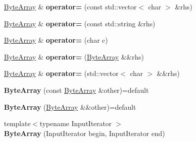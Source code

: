 \begin{DoxyCompactItemize}
\mbox{\hyperlink{class_cpp_serial_port_1_1_byte_array}{Byte\+Array}} \& {\bfseries operator=} (const std\+::vector$<$ char $>$ \&rhs)
\item 
\mbox{\label{class_cpp_serial_port_1_1_byte_array_ae19a4bc286a8e5f4f70e2cc2bb54d94e}} 
\mbox{\hyperlink{class_cpp_serial_port_1_1_byte_array}{Byte\+Array}} \& {\bfseries operator=} (const std\+::string \&rhs)
\item 
\mbox{\label{class_cpp_serial_port_1_1_byte_array_ac47b9704fc6b80017c55a5f8d5c52add}} 
\mbox{\hyperlink{class_cpp_serial_port_1_1_byte_array}{Byte\+Array}} \& {\bfseries operator=} (char c)
\item 
\mbox{\label{class_cpp_serial_port_1_1_byte_array_a1d673ed2c949891a97f4333d94bdbe4f}} 
\mbox{\hyperlink{class_cpp_serial_port_1_1_byte_array}{Byte\+Array}} \& {\bfseries operator=} (\mbox{\hyperlink{class_cpp_serial_port_1_1_byte_array}{Byte\+Array}} \&\&rhs)
\item 
\mbox{\label{class_cpp_serial_port_1_1_byte_array_a82f7485c157ed475cf66d6a21f418a26}} 
\mbox{\hyperlink{class_cpp_serial_port_1_1_byte_array}{Byte\+Array}} \& {\bfseries operator=} (std\+::vector$<$ char $>$ \&\&rhs)
\item 
\mbox{\label{class_cpp_serial_port_1_1_byte_array_a741295aadad88940dd55b198705fa2b4}} 
{\bfseries Byte\+Array} (const \mbox{\hyperlink{class_cpp_serial_port_1_1_byte_array}{Byte\+Array}} \&other)=default
\item 
\mbox{\label{class_cpp_serial_port_1_1_byte_array_ac62463175704a7f008f65ab74026d59e}} 
{\bfseries Byte\+Array} (\mbox{\hyperlink{class_cpp_serial_port_1_1_byte_array}{Byte\+Array}} \&\&other)=default
\item 
\mbox{\label{class_cpp_serial_port_1_1_byte_array_a52ec9a47a2c27ae920c79a898c6ff0b7}} 
{\footnotesize template$<$typename Input\+Iterator $>$ }\\{\bfseries Byte\+Array} (Input\+Iterator begin, Input\+Iterator end)
\item 

\end{DoxyCompactItemize}
